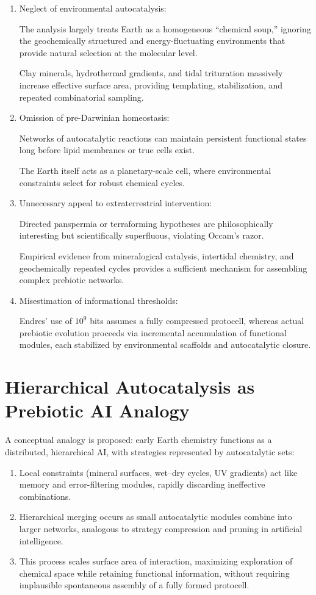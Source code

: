 \documentclass{book}
\begin{document}
\begin{enumerate}
\item Neglect of environmental autocatalysis:

The analysis largely treats Earth as a homogeneous “chemical soup,” ignoring the geochemically structured and energy-fluctuating environments that provide natural selection at the molecular level.

Clay minerals, hydrothermal gradients, and tidal trituration massively increase effective surface area, providing templating, stabilization, and repeated combinatorial sampling.

\item Omission of pre-Darwinian homeostasis:

Networks of autocatalytic reactions can maintain persistent functional states long before lipid membranes or true cells exist.

The Earth itself acts as a planetary-scale cell, where environmental constraints select for robust chemical cycles.

\item Unnecessary appeal to extraterrestrial intervention:

Directed panspermia or terraforming hypotheses are philosophically interesting but scientifically superfluous, violating Occam’s razor.

Empirical evidence from mineralogical catalysis, intertidal chemistry, and geochemically repeated cycles provides a sufficient mechanism for assembling complex prebiotic networks.

\item Misestimation of informational thresholds:

Endres’ use of $10^9$ bits assumes a fully compressed protocell, whereas actual prebiotic evolution proceeds via incremental accumulation of functional modules, each stabilized by environmental scaffolds and autocatalytic closure.
\end{enumerate}

\section{Hierarchical Autocatalysis as Prebiotic AI Analogy}
A conceptual analogy is proposed: early Earth chemistry functions as a distributed, hierarchical AI, with strategies represented by autocatalytic sets:

\begin{enumerate}
\item Local constraints (mineral surfaces, wet–dry cycles, UV gradients) act like memory and error-filtering modules, rapidly discarding ineffective combinations.
\item Hierarchical merging occurs as small autocatalytic modules combine into larger networks, analogous to strategy compression and pruning in artificial intelligence.
\item This process scales surface area of interaction, maximizing exploration of chemical space while retaining functional information, without requiring implausible spontaneous assembly of a fully formed protocell.
\end{enumerate}
\end{document}
